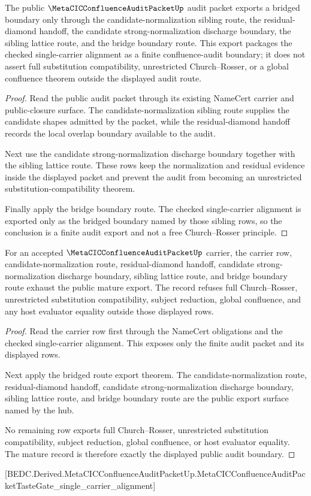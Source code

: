 \begin{theorem}
\label{thm:metacic-confluence-audit-bridged-route-export}
The public $\MetaCICConfluenceAuditPacketUp$ audit packet exports a bridged boundary only through the candidate-normalization sibling route, the residual-diamond handoff, the candidate strong-normalization discharge boundary, the sibling lattice route, and the bridge boundary route. This export packages the checked single-carrier alignment as a finite confluence-audit boundary; it does not assert full substitution compatibility, unrestricted Church--Rosser, or a global confluence theorem outside the displayed audit route.
\end{theorem}
\begin{proof}
Read the public audit packet through its existing NameCert carrier and public-closure surface. The candidate-normalization sibling route supplies the candidate shapes admitted by the packet, while the residual-diamond handoff records the local overlap boundary available to the audit.

Next use the candidate strong-normalization discharge boundary together with the sibling lattice route. These rows keep the normalization and residual evidence inside the displayed packet and prevent the audit from becoming an unrestricted substitution-compatibility theorem.

Finally apply the bridge boundary route. The checked single-carrier alignment is exported only as the bridged boundary named by those sibling rows, so the conclusion is a finite audit export and not a free Church--Rosser principle.
\end{proof}

\begin{theorem}
\label{thm:metacic-confluence-audit-mature-closure-record}
For an accepted $\MetaCICConfluenceAuditPacketUp$ carrier, the carrier row, candidate-normalization route, residual-diamond handoff, candidate strong-normalization discharge boundary, sibling lattice route, and bridge boundary route exhaust the public mature export. The record refuses full Church--Rosser, unrestricted substitution compatibility, subject reduction, global confluence, and any host evaluator equality outside those displayed rows.
\end{theorem}
\begin{proof}
Read the carrier row first through the NameCert obligations and the checked single-carrier alignment. This exposes only the finite audit packet and its displayed rows.

Next apply the bridged route export theorem. The candidate-normalization route, residual-diamond handoff, candidate strong-normalization discharge boundary, sibling lattice route, and bridge boundary route are the public export surface named by the hub.

No remaining row exports full Church--Rosser, unrestricted substitution compatibility, subject reduction, global confluence, or host evaluator equality. The mature record is therefore exactly the displayed public audit boundary.
\end{proof}

[BEDC.Derived.MetaCICConfluenceAuditPacketUp.MetaCICConfluenceAuditPacketTasteGate\_single\_carrier\_alignment]

